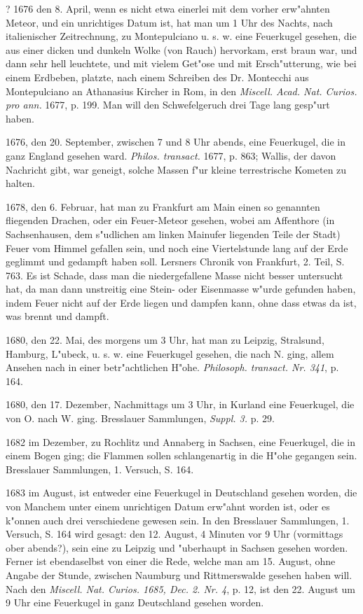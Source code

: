 \documentclass[a4paper, 11pt, oneside, polutonikogreek, german]{article}
\begin{document}
? 1676 den 8. April, wenn es nicht etwa einerlei mit dem vorher erw"ahnten Meteor, und ein unrichtiges Datum ist, hat man um 1 Uhr des Nachts, nach italienischer Zeitrechnung, zu Montepulciano u. s. w. eine Feuerkugel gesehen, die aus einer dicken und dunkeln Wolke (von Rauch) hervorkam, erst braun war, und dann sehr hell leuchtete, und mit vielem Get"ose und mit Ersch"utterung, wie bei einem Erdbeben, platzte, nach einem Schreiben des Dr. Montecchi aus Montepulciano an Athanasius Kircher in Rom, in den \emph{Miscell. Acad. Nat. Curios. pro ann.} 1677, p. 199. Man will den Schwefelgeruch drei Tage lang gesp"urt haben.

1676, den 20. September, zwischen 7 und 8 Uhr abends, eine Feuerkugel, die in ganz England gesehen ward. \emph{Philos. transact.} 1677, p. 863; Wallis, der davon Nachricht gibt, war geneigt, solche Massen f"ur kleine terrestrische Kometen zu halten.

1678, den 6. Februar, hat man zu Frankfurt am Main einen so genannten fliegenden Drachen, oder ein Feuer-Meteor gesehen, wobei am Affenthore (in Sachsenhausen, dem s"udlichen am linken Mainufer liegenden Teile der Stadt) Feuer vom Himmel gefallen sein, und noch eine Viertelstunde lang auf der Erde geglimmt und gedampft haben soll. Lersners Chronik von Frankfurt, 2. Teil, S. 763. Es ist Schade, dass man die niedergefallene Masse nicht besser untersucht hat, da man dann unstreitig eine Stein- oder Eisenmasse w"urde gefunden haben, indem Feuer nicht auf der Erde liegen und dampfen kann, ohne dass etwas da ist, was brennt und dampft.

1680, den 22. Mai, des morgens um 3 Uhr, hat man zu Leipzig, Stralsund, Hamburg, L"ubeck, u. s. w. eine Feuerkugel gesehen, die nach N. ging, allem Ansehen nach in einer betr"achtlichen H"ohe. \emph{Philosoph. transact. Nr. 341}, p. 164.

1680, den 17. Dezember, Nachmittags um 3 Uhr, in Kurland eine Feuerkugel, die von O. nach W. ging. Bresslauer Sammlungen, \emph{Suppl. 3.} p. 29.

1682 im Dezember, zu Rochlitz und Annaberg in Sachsen, eine Feuerkugel, die in einem Bogen ging; die Flammen sollen schlangenartig in die H"ohe gegangen sein. Bresslauer Sammlungen, 1. Versuch, S. 164.

1683 im August, ist entweder eine Feuerkugel in Deutschland gesehen worden, die von Manchem unter einem unrichtigen Datum erw"ahnt worden ist, oder es k"onnen auch drei verschiedene gewesen sein. In den Bresslauer Sammlungen, 1. Versuch, S. 164 wird gesagt: den 12. August, 4 Minuten vor 9 Uhr (vormittags ober abends?), sein eine zu Leipzig und "uberhaupt in Sachsen gesehen worden. Ferner ist ebendaselbst von einer die Rede, welche man am 15. August, ohne Angabe der Stunde, zwischen Naumburg und Rittmerswalde gesehen haben will. Nach den \emph{Miscell. Nat. Curios. 1685, Dec. 2. Nr. 4}, p. 12, ist den 22. August um 9 Uhr eine Feuerkugel in ganz Deutschland gesehen worden.
\end{document}
